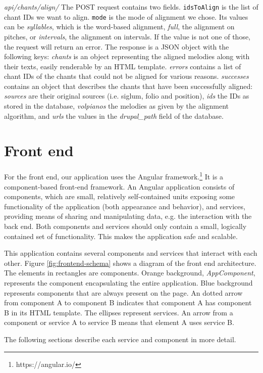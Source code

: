 \emph{api/chants/align/} The POST request contains two fields. \verb|idsToAlign| is the list of chant IDs we want to align. \verb|mode| is the mode of alignment we chose.
Its values can be \emph{syllables}, which is the word-based alignment, \emph{full}, the alignment on pitches, or \emph{intervals}, the alignment on intervals. If the
value is not one of those, the request will return an error. The response is a JSON object with the following keys: \emph{chants} is an object representing the
aligned melodies along with their texts, easily renderable by an HTML template. \emph{errors} contains a list of chant IDs of the chants that could not be aligned for
various reasons. \emph{successes} contains an object that describes the chants that have been successfully aligned: \emph{sources} are their original sources (i.e.
siglum, folio and position), \emph{ids} the IDs as stored in the database, \emph{volpianos} the melodies as given by the alignment algorithm, and \emph{urls} the
values in the \emph{drupal\_path} field of the database.

\section{Front end}

For the front end, our application uses the Angular framework.\footnote{https://angular.io/} It is a component-based front-end framework. An Angular application
consists of components, which are small, relatively self-contained units exposing some functionality of the application (both appearance and behavior), and
services, providing means of sharing and manipulating data, e.g. the interaction with the back end. Both components and services should only contain
a small, logically contained set of functionality. This makes the application safe and scalable.

This application contains several components and services that interact with each other. Figure \ref{fig:frontend-schema} shows a diagram of the front end architecture.
The elements in rectangles are components. Orange background, \emph{AppComponent}, represents the component encapsulating the entire application. Blue
background represents components that are always present on the page. An dotted arrow from component A to component B indicates that component A has component
B in its HTML template. The ellipses represent services. An arrow from a component or service A to service B means that element A uses service B.

The following sections describe each service and component in more detail.

